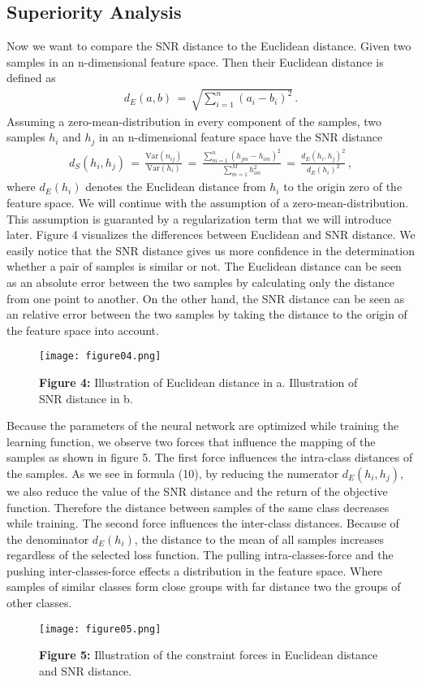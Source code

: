 \documentclass[12pt,paper=a4]{scrartcl}
\theoremstyle{break}
\begin{document}
\subsection{Superiority Analysis}
Now we want to compare the SNR distance to the Euclidean distance. Given two samples in an n-dimensional feature space. Then their Euclidean distance is defined as
\begin{align}
d_E(a,b)\, = \, \sqrt{\sum_{i=1}^n(a_i-b_i)^2}\, .
\end{align}
Assuming a zero-mean-distribution in every component of the samples, two samples $h_i$ and $h_j$ in an n-dimensional feature space have the SNR distance
\begin{align}
d_S(h_i, h_j)\,=\,\frac{\mathrm{Var}(n_{ij})}{\mathrm{Var}(h_i)}\,=\,\frac{\sum_{m=1}^n(h_{jm}-h_{im})^2}{\sum_{m=1}^M h_{im}^2}\,=\,\frac{d_E(h_i,h_j)^2}{d_E(h_i)^2}\, ,
\end{align}
where $d_E(h_i)$ denotes the Euclidean distance from $h_i$ to the origin zero of the feature space. We will continue with the assumption of a zero-mean-distribution. This assumption is guaranted by a regularization term that we will introduce later. Figure 4 visualizes the differences between Euclidean and SNR distance. We easily notice that the SNR distance gives us more confidence in the determination whether a pair of samples is similar or not. The Euclidean distance can be seen as an absolute error between the two samples by calculating only the distance from one point to another. On the other hand, the SNR distance can be seen as an relative error between the two samples by taking the distance to the origin of the feature space into account.
\begin{figure}[h]
	\centering
  \texttt{[image: figure04.png]}
  \caption{\textbf{Figure 4:} Illustration of Euclidean distance in a. Illustration of SNR distance in b.}
\end{figure}
Because the parameters of the neural network are optimized while training the learning function, we observe two forces that influence the mapping of the samples as shown in figure 5. The first force influences the intra-class distances of the samples. As we see in formula (10), by reducing the numerator $d_E(h_i,h_j)$, we also reduce the value of the SNR distance and the return of the objective function. Therefore the distance between samples of the same class decreases while training. The second force influences the inter-class distances. Because of the denominator $d_E(h_i)$,  the distance to the mean of all samples increases regardless of the selected loss function. The pulling intra-classes-force and the pushing inter-classes-force effects a distribution in the feature space. Where samples of similar classes form close groups with far distance two the groups of other classes.
\begin{figure}[h]
	\centering
  \texttt{[image: figure05.png]}
  \caption{\textbf{Figure 5:} Illustration of the constraint forces in Euclidean distance and SNR distance.\cite{source1}}
\end{figure}
\end{document}
